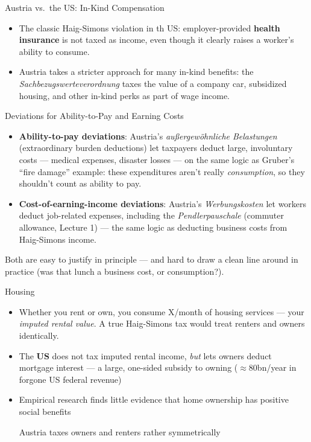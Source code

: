\documentclass[11pt,aspectratio=169]{beamer}
\begin{document}
\begin{frame}{Austria vs.\ the US: In-Kind Compensation}
  \begin{itemize}
    \item The classic Haig-Simons violation in th US: employer-provided \textbf{health insurance} is not taxed as income, even though it clearly raises a worker's ability to consume.
    \item Austria takes a stricter approach for many in-kind benefits: the \emph{Sachbezugswerteverordnung} taxes the value of a company car, subsidized housing, and other in-kind perks as part of wage income.
  \end{itemize}


\end{frame}

\begin{frame}{Deviations for Ability-to-Pay and Earning Costs}
  \small
  \begin{itemize}
    \item \textbf{Ability-to-pay deviations}: Austria's \emph{außergewöhnliche Belastungen} (extraordinary burden deductions) let taxpayers deduct large, involuntary costs --- medical expenses, disaster losses --- on the same logic as Gruber's ``fire damage'' example: these expenditures aren't really \emph{consumption}, so they shouldn't count as ability to pay.
    \item \textbf{Cost-of-earning-income deviations}: Austria's \emph{Werbungskosten} let workers deduct job-related expenses, including the \emph{Pendlerpauschale} (commuter allowance, Lecture 1) --- the same logic as deducting business costs from Haig-Simons income.
  \end{itemize}
  \vspace{0.3em}
  \centering
  Both are easy to justify in principle --- and hard to draw a clean line around in practice (was that lunch a business cost, or consumption?).
\end{frame}

\begin{frame}{Housing}
  \footnotesize
  \begin{itemize}
    \item Whether you rent or own, you consume \texteuro{}X/month of housing services --- your \emph{imputed rental value}. A true Haig-Simons tax would treat renters and owners identically.
    \item The \textbf{US} does not tax imputed rental income, \emph{but} lets owners deduct mortgage interest --- a large, one-sided subsidy to owning (\(\approx\)\texteuro{}80bn/year in forgone US federal revenue)
    \item Empirical research finds little evidence that home ownership has positive social benefits

    Austria   taxes owners and renters rather symmetrically

  \end{itemize}
\end{frame}
\end{document}
